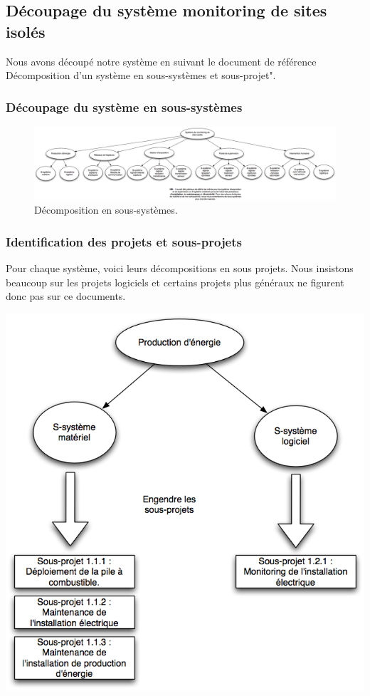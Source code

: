 \subsection{Découpage du système monitoring de sites isolés}
Nous avons découpé notre système en suivant le document de référence \og Décomposition d'un système en sous-systèmes et sous-projet".

\subsubsection{Découpage du système en sous-systèmes}


\begin{figure}[H]
\centering
\includegraphics[scale=0.4, angle=90]{png/graphDecompoSousSystemes.png}
\caption*{Décomposition en sous-systèmes.}
\end{figure}


\subsubsection{Identification des projets et sous-projets}
Pour chaque système, voici leurs décompositions en sous projets. Nous insistons beaucoup sur les projets logiciels et certains projets plus \og généraux \fg ne figurent donc pas sur ce documents.

\begin {center}
\includegraphics[width=\textwidth]{png/ss1ProdE.png}
\caption{Découpage en sous-projets du sous-système production d'énergie}
\end {center} 

